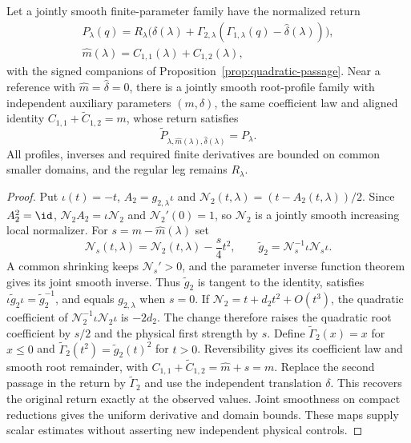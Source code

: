 \begin{lemma}
\label{lem:auxiliary-controls}
Let a jointly smooth finite-parameter family have the normalized return
\[
 \begin{gathered}
 P_\lambda(q)=R_\lambda\bigl(\widehat\delta(\lambda)+
 \Gamma_{2,\lambda}(\Gamma_{1,\lambda}(q)
                              -\widehat\delta(\lambda))\bigr),\\
 \widehat m(\lambda)=C_{1,1}(\lambda)+C_{1,2}(\lambda),
 \end{gathered}
\]
with the signed companions of Proposition~\ref{prop:quadratic-passage}.
Near a reference with $\widehat m=\widehat\delta=0$, there is a jointly
smooth root-profile family with independent auxiliary parameters
$(m,\delta)$, the same coefficient law and aligned identity
$C_{1,1}+\widetilde C_{1,2}=m$, whose return satisfies
\[
 \widetilde P_{\lambda,\widehat m(\lambda),
                       \widehat\delta(\lambda)}=P_\lambda.
\]
All profiles, inverses and required finite derivatives are bounded on
common smaller domains, and the regular leg remains $R_\lambda$.
\end{lemma}

\begin{proof}
Put $\iota(t)=-t$, $A_2=g_{2,\lambda}\iota$ and
$\mathcal N_2(t,\lambda)=(t-A_2(t,\lambda))/2$.
Since $A_2^2=\id$, $\mathcal N_2A_2=\iota\mathcal N_2$ and
$\mathcal N_2'(0)=1$, so $\mathcal N_2$ is a jointly smooth increasing
local normalizer. For $s=m-\widehat m(\lambda)$ set
\[
 \mathcal N_s(t,\lambda)=\mathcal N_2(t,\lambda)-\frac s4t^2,
 \qquad \widetilde g_2=\mathcal N_s^{-1}\iota\mathcal N_s\iota.
\]
A common shrinking keeps $\mathcal N_s'>0$, and the parameter inverse
function theorem gives its joint smooth inverse. Thus $\widetilde g_2$
is tangent to the identity, satisfies
$\iota\widetilde g_2\iota=\widetilde g_2^{-1}$, and equals $g_{2,\lambda}$
when $s=0$. If $\mathcal N_2=t+d_2t^2+O(t^3)$, the quadratic coefficient
of $\mathcal N_2^{-1}\iota\mathcal N_2\iota$ is $-2d_2$.
The change therefore raises the quadratic root coefficient by $s/2$
and the physical first strength by $s$.
Define $\widetilde\Gamma_2(x)=x$ for $x\le0$ and
$\widetilde\Gamma_2(t^2)=\widetilde g_2(t)^2$ for $t>0$.
Reversibility gives its coefficient law and smooth root remainder, with
$C_{1,1}+\widetilde C_{1,2}=\widehat m+s=m$.
Replace the second passage in the return by $\widetilde\Gamma_2$ and
use the independent translation $\delta$. This recovers the original
return exactly at the observed values. Joint smoothness on compact
reductions gives the uniform derivative and domain bounds. These maps
supply scalar estimates without asserting new independent physical
controls.
\end{proof}

